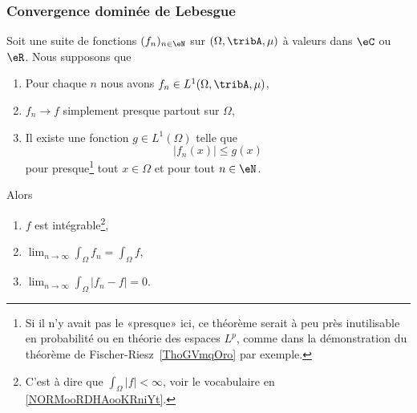 \subsubsection{Convergence dominée de Lebesgue}

\begin{theorem}        \label{ThoConvDomLebVdhsTf}
	Soit une suite de fonctions \( (f_n)_{n\in \eN}\) sur \( (\Omega,\tribA,\mu)\) à valeurs dans \( \eC\) ou \( \eR\). Nous supposons que
	\begin{enumerate}
		\item
		      Pour chaque \( n\) nous avons \( f_n\in L^1(\Omega,\tribA,\mu)\),
		\item
		      \( f_n\to f\) simplement presque partout sur \( \Omega\),
		\item
		      Il existe une fonction \( g\in L^1(\Omega)\) telle que
		      \begin{equation}
			      | f_n(x) | \leq g(x)
		      \end{equation}
		      pour presque\footnote{Si il n'y avait pas le «presque» ici, ce théorème serait à peu près inutilisable en probabilité ou en théorie des espaces \( L^p\), comme dans la démonstration du théorème de Fischer-Riesz~\ref{ThoGVmqOro} par exemple.} tout \( x\in\Omega\) et pour tout \( n\in \eN\).
	\end{enumerate}
	Alors
	\begin{enumerate}
		\item
		      \( f\) est intégrable\footnote{C'est à dire que \( \int_{\Omega}| f |<\infty\), voir le vocabulaire en \ref{NORMooRDHAooKRniYt}.},
		\item
		      \( \lim_{n\to \infty} \int_{\Omega}f_n=\int_\Omega f\),
		\item
		      \( \lim_{n\to \infty} \int_{\Omega}| f_n-f |=0\).
	\end{enumerate}
\end{theorem}

